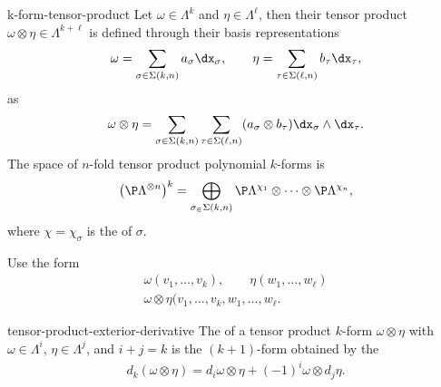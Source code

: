 \begin{Definition}{k-form-tensor-product}
  Let $\omega\in \Lambda^k$ and $\eta\in\Lambda^\ell$, then their
  tensor product $\omega\otimes\eta\in\Lambda^{k+\ell}$ is defined through
  their basis representations
  \begin{gather}
    \omega = \sum_{\sigma\in\Sigma(k,n)} a_\sigma \dx_\sigma,
    \qquad
    \eta = \sum_{\tau\in\Sigma(\ell,n)} b_\tau \dx_\tau,
  \end{gather}
  as
  \begin{gather}
    \omega\otimes\eta = \sum_{\sigma\in\Sigma(k,n)}\sum_{\tau\in\Sigma(\ell,n)}
    (a_\sigma\otimes b_\tau) \dx_\sigma \wedge \dx_\tau.
  \end{gather}
  The space of $n$-fold tensor product polynomial $k$-forms is
  \begin{gather}
    \left(\P\Lambda^{\otimes n}\right)^k
    = \bigoplus_{\sigma_\in\Sigma(k,n)}
    \P\Lambda^{\chi_1} \otimes \dots \otimes \P\Lambda^{\chi_n},
  \end{gather}
  where $\chi= \chi_\sigma$ is the  of $\sigma$.
\end{Definition}

\begin{todo}
  Use the form
  \begin{gather}
    \omega(v_1,\dots,v_k), \qquad \eta(w_1,\dots,w_\ell)\\
    \omega\otimes \eta(v_1,\dots,v_k,w_1,\dots,w_\ell.
  \end{gather}
\end{todo}

\begin{Lemma}{tensor-product-exterior-derivative}
  The  of a tensor product $k$-form
  $\omega\otimes\eta$ with $\omega\in\Lambda^i$,
  $\eta\in\Lambda^j$, and $i+j=k$ is the $(k+1)$-form obtained by the
  \begin{gather}
    d_k(\omega\otimes\eta) = d_i\omega \otimes \eta +  (-1)^i \omega \otimes d_j\eta.
  \end{gather}
\end{Lemma}

